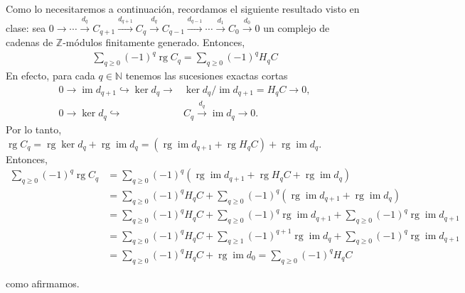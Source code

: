 \documentclass[11pt]{article}
\newcommand{\N}{\mathbb{N}}
\newcommand{\Z}{\mathbb{Z}}
\newcommand{\rg}{\operatorname{rg}}
\newcommand{\im}{\operatorname{im}}
\newcommand{\paint}[2]{\color{#1}{#2}}
\newenvironment{obs}[2][Observaci\'on]{\begin{trivlist}
\item[\hskip \labelsep \paint{orange}{{\bfseries #1}}\hskip \labelsep {\bfseries #2.}]}{\end{trivlist}}
\begin{document}
\begin{obs}{3} Como lo necesitaremos a continuaci\'on, recordamos el siguiente resultado visto en clase: sea $0 \to \cdots \xrightarrow{d_{q}} C_{q+1} \xrightarrow{d_{q+1}} C_q \xrightarrow{d_{q}} C_{q-1} \xrightarrow{d_{q-1}} \cdots \xrightarrow{d_{1}} C_0 \xrightarrow{d_0} 0$ un complejo de cadenas de $\Z$-m\'odulos finitamente generado. Entonces,
\begin{align*}
\sum_{q \geq 0}(-1)^q\rg C_q = \sum_{q \geq 0}(-1)^qH_qC
\end{align*}
En efecto, para cada $q \in \N$ tenemos las sucesiones exactas cortas
\begin{align*}
0 \to \im d_{q+1} \hookrightarrow \ker d_q \to &\ker d_q/\im d_{q+1} = H_qC \to 0, \\
0 \to \ker d_q \hookrightarrow &C_q \xrightarrow{d_q} \im d_q \to 0.
\end{align*}
Por lo tanto, $\rg C_q =  \rg \ker d_q + \rg \im d_q = (\rg \im d_{q+1} + \rg H_qC) + \rg \im d_q$. Entonces,
\begin{align*}
\sum_{q \geq 0}(-1)^q\rg C_q &= \sum_{q \geq 0}(-1)^q(\rg \im d_{q+1} + \rg H_qC + \rg \im d_q)\\
&= \sum_{q \geq 0}(-1)^qH_qC + \sum_{q \geq 0}(-1)^q(\rg \im d_{q+1} + \rg \im d_q)\\
&= \sum_{q \geq 0}(-1)^qH_qC + \sum_{q \geq 0}(-1)^q\rg \im d_{q+1} + \sum_{q \geq 0}(-1)^q\rg \im d_{q+1}\\
&= \sum_{q \geq 0}(-1)^qH_qC + \sum_{q \geq 1}(-1)^{q+1}\rg \im d_{q} + \sum_{q \geq 0}(-1)^q\rg \im d_{q+1}\\
&= \sum_{q \geq 0}(-1)^qH_qC + \rg \im d_0 = \sum_{q \geq 0}(-1)^qH_qC
\end{align*} 
\end{obs}
como afirmamos.
\end{document}
